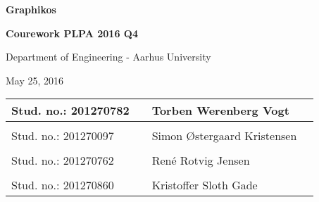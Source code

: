 
\centerline{\Huge\bfseries\color{ThemeColor} Graphikos}

\vspace{1em}
\centerline{\Large\bfseries\color{BlackColor} Courework PLPA 2016 Q4}



\vspace{5em}
\centerline{\large\bfseries\color{BlackColor}}
\centerline{\large\color{BlackColor}Department of Engineering - Aarhus University}

\vspace{0.5em}
\centerline{\large\color{BlackColor} May 25, 2016}

\vspace{25em}

\begin{center}
   \begin{tabular}{ l p{3cm} l l }
   Stud. no.: 201270782 && Torben Werenberg Vogt & \\\hline
   & & \\
   Stud. no.: 201270097 && Simon Østergaard Kristensen & \\\hline
   & & \\
   Stud. no.: 201270762 && René Rotvig Jensen & \\\hline
   & & \\
   Stud. no.: 201270860 && Kristoffer Sloth Gade & \\\hline
   \end{tabular}
\end{center}
\thispagestyle{empty} %
\restoregeometry

